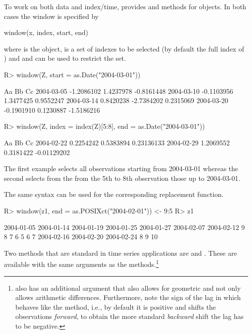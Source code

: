 \documentclass[article,nojss]{jss}
\begin{document}
To work on both data and index/time,  provides
 and  methods for  objects.
In both cases the window is specified by
\begin{Scode}
window(x, index, start, end)
\end{Scode}
where  is the  object,  is a set
of indexes to be selected (by default the full index of )
and  and  can be used to restrict the 
 set. 
\begin{Schunk}
\begin{Sinput}
R> window(Z, start = as.Date("2004-03-01"))
\end{Sinput}
\begin{Soutput}
                   Aa         Bb         Cc
2004-03-05 -1.2086102  1.4237978 -0.8161448
2004-03-10 -0.1103956  1.3477425  0.9552247
2004-03-14  0.8420238 -2.7384202  0.2315069
2004-03-20 -0.1901910  0.1230887 -1.5186216
\end{Soutput}
\begin{Sinput}
R> window(Z, index = index(Z)[5:8], end = as.Date("2004-03-01"))
\end{Sinput}
\begin{Soutput}
                  Aa        Bb          Cc
2004-02-22 0.2254242 0.5383894  0.23136133
2004-02-29 1.2069552 0.3181422 -0.01129202
\end{Soutput}
\end{Schunk}

The first example selects all observations starting from 2004-03-01
whereas the second selects from the from the 5th to 8th observation
those up to 2004-03-01.

The same syntax can be used for the corresponding replacement function.
\begin{Schunk}
\begin{Sinput}
R> window(z1, end = as.POSIXct("2004-02-01")) <- 9:5
R> z1
\end{Sinput}
\begin{Soutput}
2004-01-05 2004-01-14 2004-01-19 2004-01-25 2004-01-27 2004-02-07 2004-02-12 
         9          8          7          6          5          6          7 
2004-02-16 2004-02-20 2004-02-24 
         8          9         10 
\end{Soutput}
\end{Schunk}

Two methods that are standard in time series applications
are  and . These are available with the same
arguments as the  methods.\footnote{ also
has an additional argument that also allows for geometric and
not only allows arithmetic differences. Furthermore, note the sign
of the lag in  which behaves like the  method, i.e.,
by default it is positive and shifts the 
observations \emph{forward}, to obtain the more standard \emph{backward}
shift the lag has to be negative.}
\end{document}
